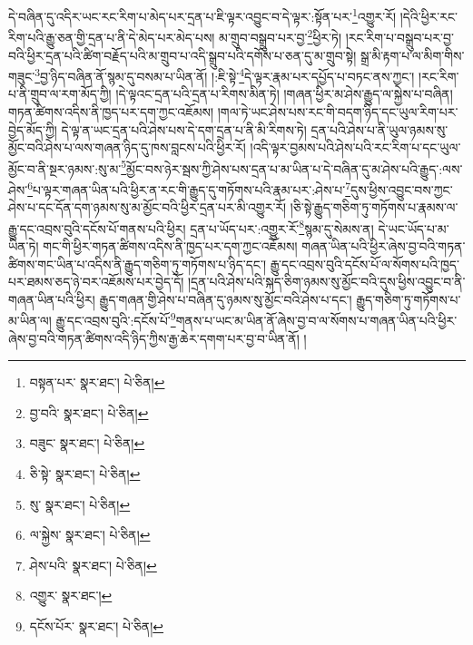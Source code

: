 དེ་བཞིན་དུ་འདིར་ཡང་རང་རིག་པ་མེད་པར་དྲན་པ་ཇི་ལྟར་འབྱུང་བ་དེ་ལྟར་:སྟོན་པར་\footnote{བསྟན་པར་  སྣར་ཐང་།  པེ་ཅིན། }འགྱུར་རོ། །དེའི་ཕྱིར་རང་རིག་པའི་རྒྱུ་ཅན་གྱི་དྲན་པ་ནི་དེ་མེད་པར་མེད་པས། མ་གྲུབ་བསྒྲུབ་པར་བྱ་\footnote{བྱ་བའི་  སྣར་ཐང་།  པེ་ཅིན། }ཕྱིར་ཏེ། །རང་རིག་པ་བསྒྲུབ་པར་བྱ་བའི་ཕྱིར་དྲན་པའི་ཚིག་བརྗོད་པའི་མ་གྲུབ་པ་འདི་སྒྲུབ་པའི་དགོས་པ་ཅན་དུ་མ་གྲུབ་སྟེ། སྒྲ་མི་རྟག་པ་ལ་མིག་གིས་གཟུང་\footnote{བཟུང་  སྣར་ཐང་།  པེ་ཅིན། }བྱ་ཉིད་བཞིན་ནོ་སྙམ་དུ་བསམ་པ་ཡིན་ནོ། །:ཇི་སྟེ་\footnote{ཅི་སྟེ་  སྣར་ཐང་།  པེ་ཅིན། }དེ་ལྟར་རྣམ་པར་དཔྱོད་པ་བཏང་ནས་ཀྱང་། །རང་རིག་པ་ནི་གྲུབ་ལ་རག་མོད་ཀྱི། །དེ་ལྟའང་དྲན་པའི་དྲན་པ་རིགས་མིན་ཏེ། །གཞན་ཕྱིར་མ་ཤེས་རྒྱུད་ལ་སྐྱེས་པ་བཞིན། གཏན་ཚིགས་འདིས་ནི་ཁྱད་པར་དག་ཀྱང་འཇོམས། །གལ་ཏེ་ཡང་ཤེས་པས་རང་གི་བདག་ཉིད་དང་ཡུལ་རིག་པར་བྱེད་མོད་ཀྱི། དེ་ལྟ་ན་ཡང་དྲན་པའི་ཤེས་པས་དེ་དག་དྲན་པ་ནི་མི་རིགས་ཏེ། དྲན་པའི་ཤེས་པ་ནི་ཡུལ་ཉམས་སུ་མྱོང་བའི་ཤེས་པ་ལས་གཞན་ཉིད་དུ་ཁས་བླངས་པའི་ཕྱིར་རོ། །འདི་ལྟར་བྱམས་པའི་ཤེས་པའི་རང་རིག་པ་དང་ཡུལ་མྱོང་བ་ནི་སྔར་ཉམས་:སུ་མ་\footnote{སུ་  སྣར་ཐང་།  པེ་ཅིན། }མྱོང་བས་ཉེར་སྦས་ཀྱི་ཤེས་པས་དྲན་པ་མ་ཡིན་པ་དེ་བཞིན་དུ་མ་ཤེས་པའི་རྒྱུད་:ལས་ཤེས་\footnote{ལ་སྐྱེས་  སྣར་ཐང་།  པེ་ཅིན། }པ་ལྟར་གཞན་ཡིན་པའི་ཕྱིར་ན་རང་གི་རྒྱུད་དུ་གཏོགས་པའི་རྣམ་པར་:ཤེས་པ་\footnote{ཤེས་པའི་  སྣར་ཐང་།  པེ་ཅིན། }དུས་ཕྱིས་འབྱུང་བས་ཀྱང་ཤེས་པ་དང་དོན་དག་ཉམས་སུ་མ་མྱོང་བའི་ཕྱིར་དྲན་པར་མི་འགྱུར་རོ། །ཅི་སྟེ་རྒྱུད་གཅིག་ཏུ་གཏོགས་པ་རྣམས་ལ་རྒྱུ་དང་འབྲས་བུའི་དངོས་པོ་གནས་པའི་ཕྱིར། དྲན་པ་ཡོད་པར་:འགྱུར་རོ་\footnote{འགྱུར་  སྣར་ཐང་། }སྙམ་དུ་སེམས་ན། དེ་ཡང་ཡོད་པ་མ་ཡིན་ཏེ། གང་གི་ཕྱིར་གཏན་ཚིགས་འདིས་ནི་ཁྱད་པར་དག་ཀྱང་འཇོམས། གཞན་ཡིན་པའི་ཕྱིར་ཞེས་བྱ་བའི་གཏན་ཚིགས་གང་ཡིན་པ་འདིས་ནི་རྒྱུད་གཅིག་ཏུ་གཏོགས་པ་ཉིད་དང་། རྒྱུ་དང་འབྲས་བུའི་དངོས་པོ་ལ་སོགས་པའི་ཁྱད་པར་ཐམས་ཅད་ཉེ་བར་འཇོམས་པར་བྱེད་དོ། །དྲན་པའི་ཤེས་པའི་སྐད་ཅིག་ཉམས་སུ་མྱོང་བའི་དུས་ཕྱིས་འབྱུང་བ་ནི་གཞན་ཡིན་པའི་ཕྱིར། རྒྱུད་གཞན་གྱི་ཤེས་པ་བཞིན་དུ་ཉམས་སུ་མྱོང་བའི་ཤེས་པ་དང་། རྒྱུད་གཅིག་ཏུ་གཏོགས་པ་མ་ཡིན་ལ། རྒྱུ་དང་འབྲས་བུའི་:དངོས་པོ་\footnote{དངོས་པོར་  སྣར་ཐང་།  པེ་ཅིན། }གནས་པ་ཡང་མ་ཡིན་ནོ་ཞེས་བྱ་བ་ལ་སོགས་པ་གཞན་ཡིན་པའི་ཕྱིར་ཞེས་བྱ་བའི་གཏན་ཚིགས་འདི་ཉིད་ཀྱིས་རྒྱ་ཆེར་དགག་པར་བྱ་བ་ཡིན་ནོ། །

